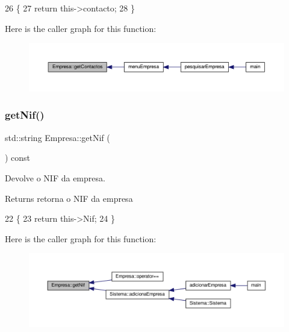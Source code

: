 \begin{DoxyCode}
26                                      \{
27     \textcolor{keywordflow}{return} this->contacto;
28 \}
\end{DoxyCode}
Here is the caller graph for this function\+:
\nopagebreak
\begin{figure}[H]
\begin{center}
\leavevmode
\includegraphics[width=350pt]{classEmpresa_a19396f860d9b17f94bd262ba093d76eb_icgraph}
\end{center}
\end{figure}
\mbox{\label{classEmpresa_a6ab12452496ccaea5493bd2c67824f09}} 
\subsubsection{\texorpdfstring{get\+Nif()}{getNif()}}
{\footnotesize\ttfamily std\+::string Empresa\+::get\+Nif (\begin{DoxyParamCaption}{ }\end{DoxyParamCaption}) const}



Devolve o N\+IF da empresa. 

\begin{DoxyReturn}{Returns}
retorna o N\+IF da empresa 
\end{DoxyReturn}

\begin{DoxyCode}
22                                \{
23     \textcolor{keywordflow}{return} this->Nif;
24 \}
\end{DoxyCode}
Here is the caller graph for this function\+:
\nopagebreak
\begin{figure}[H]
\begin{center}
\leavevmode
\includegraphics[width=350pt]{classEmpresa_a6ab12452496ccaea5493bd2c67824f09_icgraph}
\end{center}
\end{figure}
\mbox{\label{classEmpresa_a99bc2de98a0c0348abb74c93e6e7159e}} 
